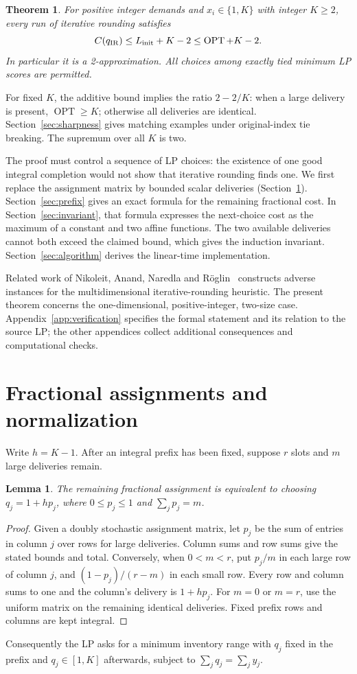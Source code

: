 \documentclass[11pt]{article}
\newtheorem{lemma}{Lemma}
\newtheorem{theorem}{Theorem}
\newcommand{\OPT}{\operatorname{OPT}}
\begin{document}
\begin{theorem}\label{thm:main}
For positive integer demands and $x_i\in\{1,K\}$ with integer $K\ge2$,
every run of iterative rounding satisfies
\[
C(q_{\rm IR})\le L_{\rm init}+K-2\le\OPT+K-2.
\]
In particular it is a 2-approximation. All choices among exactly tied
minimum LP scores are permitted.
\end{theorem}

For fixed $K$, the additive bound implies the ratio $2-2/K$: when a
large delivery is present, $\OPT\ge K$; otherwise all deliveries are
identical. Section~\ref{sec:sharpness} gives matching examples under
original-index tie breaking. The supremum over all $K$ is two.

The proof must control a sequence of LP choices: the existence of one
good integral completion would not show that iterative rounding finds
one. We first replace the assignment matrix by bounded scalar deliveries
(Section~\ref{sec:assignment}). Section~\ref{sec:prefix} gives an exact formula for the remaining
fractional cost. In Section~\ref{sec:invariant}, that formula expresses
the next-choice cost as the maximum of a constant and two affine
functions. The two available deliveries cannot both exceed the claimed
bound, which gives the induction invariant.
Section~\ref{sec:algorithm} derives the linear-time implementation.

Related work of Nikoleit, Anand, Naredla and R\"oglin~\cite{nikoleit}
constructs adverse instances for the multidimensional iterative-rounding
heuristic. The present theorem concerns the one-dimensional, positive-integer,
two-size case. Appendix~\ref{app:verification} specifies the formal
statement and its relation to the source LP; the other appendices collect
additional consequences and computational checks.

\section{Fractional assignments and normalization}\label{sec:assignment}
Write $h=K-1$. After an integral prefix has been fixed, suppose $r$ slots and
$m$ large deliveries remain.
\begin{lemma}
The remaining fractional assignment is equivalent to choosing
$q_j=1+h p_j$, where $0\le p_j\le1$ and $\sum_jp_j=m$.
\end{lemma}
\begin{proof}
Given a doubly stochastic assignment matrix, let $p_j$ be the sum of entries
in column $j$ over rows for large deliveries. Column sums and row sums give
the stated bounds and total. Conversely, when $0<m<r$, put $p_j/m$ in each
large row of column $j$, and $(1-p_j)/(r-m)$ in each small row. Every row and
column sums to one and the column's delivery is $1+h p_j$. For $m=0$ or $m=r$,
use the uniform matrix on the remaining identical deliveries. Fixed prefix
rows and columns are kept integral.
\end{proof}
Consequently the LP asks for a minimum inventory range with $q_j$ fixed in
the prefix and $q_j\in[1,K]$ afterwards, subject to $\sum_jq_j=\sum_jy_j$.
\end{document}
